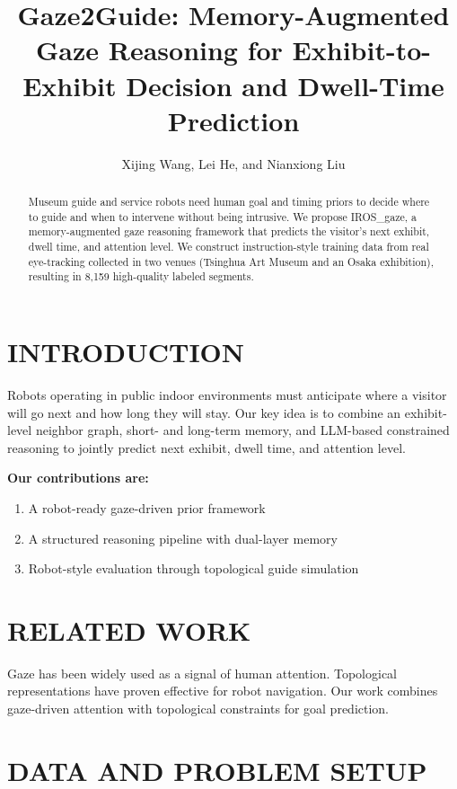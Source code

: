 \documentclass{article}
\begin{document}
\title{Gaze2Guide: Memory-Augmented Gaze Reasoning for Exhibit-to-Exhibit Decision and Dwell-Time Prediction}
\author{Xijing Wang, Lei He, and Nianxiong Liu}
\date{}
\maketitle

\begin{abstract}
Museum guide and service robots need human goal and timing priors to decide where to guide and when to intervene without being intrusive. We propose IROS\_gaze, a memory-augmented gaze reasoning framework that predicts the visitor's next exhibit, dwell time, and attention level. We construct instruction-style training data from real eye-tracking collected in two venues (Tsinghua Art Museum and an Osaka exhibition), resulting in 8,159 high-quality labeled segments.
\end{abstract}

\section{INTRODUCTION}

Robots operating in public indoor environments must anticipate where a visitor will go next and how long they will stay. Our key idea is to combine an exhibit-level neighbor graph, short- and long-term memory, and LLM-based constrained reasoning to jointly predict next exhibit, dwell time, and attention level.

\textbf{Our contributions are:}

\begin{enumerate}
    \item A robot-ready gaze-driven prior framework
    \item A structured reasoning pipeline with dual-layer memory
    \item Robot-style evaluation through topological guide simulation
\end{enumerate}

\section{RELATED WORK}

Gaze has been widely used as a signal of human attention. Topological representations have proven effective for robot navigation. Our work combines gaze-driven attention with topological constraints for goal prediction.

\section{DATA AND PROBLEM SETUP}
\end{document}

